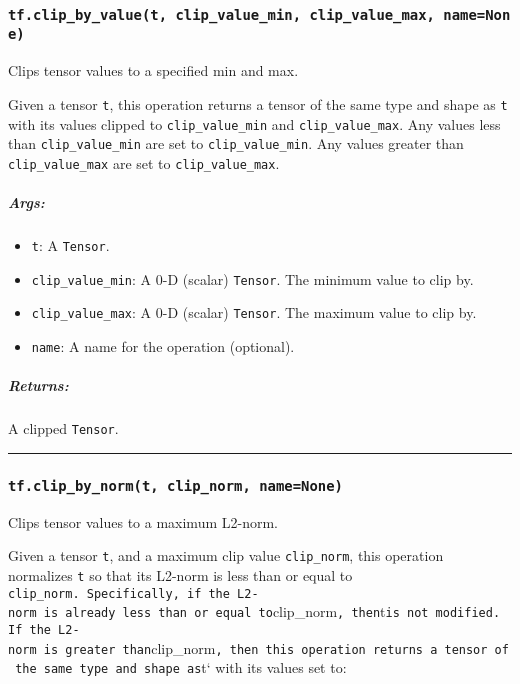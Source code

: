 \subsubsection{\texorpdfstring{\texttt{tf.clip\_by\_value(t,\ clip\_value\_min,\ clip\_value\_max,\ name=None)}
}{tf.clip\_by\_value(t, clip\_value\_min, clip\_value\_max, name=None) }}\label{tf.clipux5fbyux5fvaluet-clipux5fvalueux5fmin-clipux5fvalueux5fmax-namenone}

Clips tensor values to a specified min and max.

Given a tensor \texttt{t}, this operation returns a tensor of the same
type and shape as \texttt{t} with its values clipped to
\texttt{clip\_value\_min} and \texttt{clip\_value\_max}. Any values less
than \texttt{clip\_value\_min} are set to \texttt{clip\_value\_min}. Any
values greater than \texttt{clip\_value\_max} are set to
\texttt{clip\_value\_max}.

\subparagraph{Args: }\label{args-13}

\begin{itemize}
\tightlist
\item
  \texttt{t}: A \texttt{Tensor}.
\item
  \texttt{clip\_value\_min}: A 0-D (scalar) \texttt{Tensor}. The minimum
  value to clip by.
\item
  \texttt{clip\_value\_max}: A 0-D (scalar) \texttt{Tensor}. The maximum
  value to clip by.
\item
  \texttt{name}: A name for the operation (optional).
\end{itemize}

\subparagraph{Returns: }\label{returns-7}

A clipped \texttt{Tensor}.

\begin{center}\rule{0.5\linewidth}{\linethickness}\end{center}

\subsubsection{\texorpdfstring{\texttt{tf.clip\_by\_norm(t,\ clip\_norm,\ name=None)}
}{tf.clip\_by\_norm(t, clip\_norm, name=None) }}\label{tf.clipux5fbyux5fnormt-clipux5fnorm-namenone}

Clips tensor values to a maximum L2-norm.

Given a tensor \texttt{t}, and a maximum clip value \texttt{clip\_norm},
this operation normalizes \texttt{t} so that its L2-norm is less than or
equal to
\texttt{clip\_norm\textquotesingle{}.\ Specifically,\ if\ the\ L2-norm\ is\ already\ less\ than\ or\ equal\ to}clip\_norm\texttt{,\ then}t\texttt{is\ not\ modified.\ If\ the\ L2-norm\ is\ greater\ than}clip\_norm\texttt{,\ then\ this\ operation\ returns\ a\ tensor\ of\ the\ same\ type\ and\ shape\ as}t`
with its values set to:

